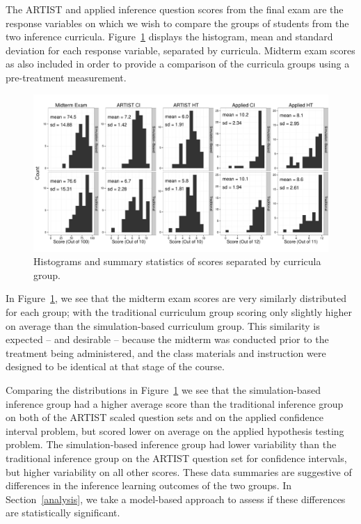 The ARTIST and applied inference question scores from the final exam are the response variables on which we wish to compare the groups of students from the two inference curricula. Figure~\ref{fig:ScoreHistsByGroup} displays the histogram, mean and standard deviation for each response variable, separated by curricula.  Midterm exam scores as also included in order to provide a comparison of the curricula groups using a pre-treatment measurement. 

\begin{knitrout}
\color{fgcolor}\begin{figure}[H]

{\centering \includegraphics[width=1\linewidth]{figure/ScoreHistsByGroup-1} 

}

\caption[Histograms and summary statistics of scores separated by curricula group]{Histograms and summary statistics of scores separated by curricula group.}\label{fig:ScoreHistsByGroup}
\end{figure}


\end{knitrout}
\vspace{.05in}
In Figure~\ref{fig:ScoreHistsByGroup}, we see that the midterm exam scores are very similarly distributed for each group; with the traditional curriculum group scoring only slightly higher on average than the simulation-based curriculum group. This similarity is expected -- and desirable -- because the midterm was conducted prior to the treatment being administered, and the class materials and instruction were designed to be identical at that stage of the course.

Comparing the distributions in Figure~\ref{fig:ScoreHistsByGroup} we see that the simulation-based inference group had a higher average score than the traditional inference group on both of the ARTIST scaled question sets and on the applied confidence interval problem, but scored lower on average on the applied hypothesis testing problem.  The simulation-based inference group had lower variability than the traditional inference group on the ARTIST question set for confidence intervals, but higher variability on all other scores. These data summaries are suggestive of differences in the inference learning outcomes of the two groups. In Section~\ref{analysis}, we take a model-based approach to assess if these differences are statistically significant.




